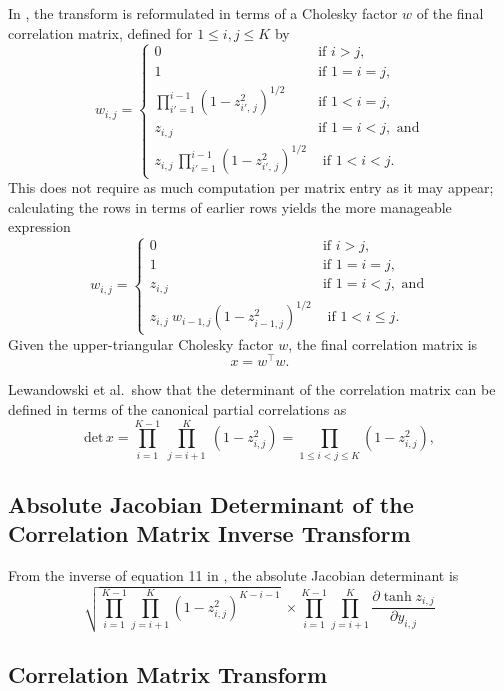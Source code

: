 In \Stan, the \LKJ transform is reformulated in terms of a Cholesky factor $w$
of the final correlation matrix, defined for $1 \leq i,j \leq K$ by
%
\[
w_{i,j} =
\left\{
\begin{array}{cl}
%
0 & \mbox{if } i > j,
\\[4pt]
1 & \mbox{if } 1 = i = j,
\\[12pt]
\prod_{i'=1}^{i - 1} \left( 1 - z_{i'\!,\,j}^2 \right)^{1/2}
& \mbox{if } 1 < i = j,
\\[12pt]
z_{i,j} & \mbox{if } 1 = i < j, \mbox{ and}
\\[12pt]
z_{i,j} \, \prod_{i'=1}^{i-1} \left( 1 - z_{i'\!,\,j}^2 \right)^{1/2}
& \mbox{ if } 1 < i < j.
%
\end{array}
\right.
\]
%
This does not require as much computation per matrix entry as it may appear;
calculating the rows in terms of earlier rows yields the more
manageable expression
%
\[
w_{i,j} =
\left\{
\begin{array}{cl}
%
0 & \mbox{if } i > j,
\\[4pt]
1 & \mbox{if } 1 = i = j,
\\[8pt]
z_{i,j} & \mbox{if } 1 = i < j, \mbox{ and}
\\[8pt]
z_{i,j} \ w_{i-1,j} \left( 1 - z_{i-1,j}^2 \right)^{1/2}
& \mbox{ if } 1 < i \leq j.
%
\end{array}
\right.
\]
Given the upper-triangular Cholesky factor $w$, the final correlation
matrix is
\[
x = w^{\top} w.
\]

Lewandowski et al.\ show that the determinant of the correlation
matrix can be defined in terms of the canonical partial correlations
as
%
\[
\mbox{det} \, x = \prod_{i=1}^{K-1} \ \prod_{j=i+1}^K \ (1 - z_{i,j}^2)
 = \prod_{1 \leq i < j \leq K} (1 - z_{i,j}^2),
\]

\subsection{Absolute Jacobian Determinant of the Correlation
  Matrix Inverse Transform}
From the inverse of equation 11 in \cite{LewandowskiKurowickaJoe:2009},
the absolute Jacobian determinant is
%
\[
\sqrt{\prod_{i=1}^{K-1}\prod_{j=i+1}^K \left(1-z_{i,j}^2\right)^{K-i-1}} \
\times \prod_{i=1}^{K-1}\prod_{j=i+1}^K
\frac{\partial \tanh z_{i,j}}{\partial y_{i,j}}
\]
\subsection{Correlation Matrix Transform}

